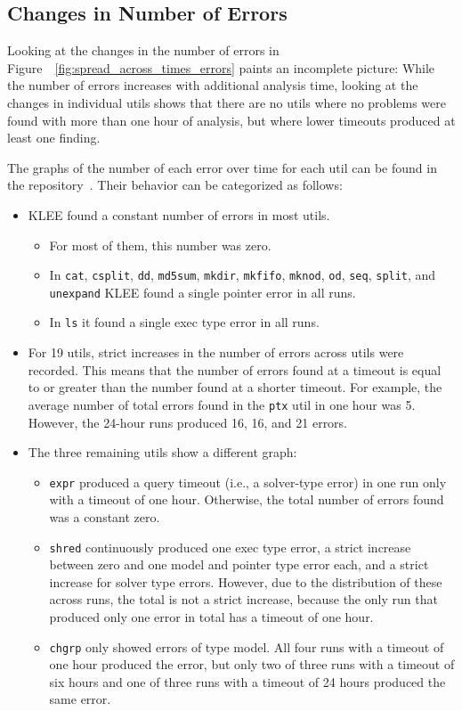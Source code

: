 \documentclass{article}
\let\savedCite=\cite
\renewcommand{\cite}{\unskip~\savedCite}
\let\savedRef=\ref
\renewcommand{\ref}{\unskip~\savedRef}
\begin{document}
\subsection{Changes in Number of Errors}

Looking at the changes in the number of errors in Figure~\ref{fig:spread_across_times_errors} paints an incomplete picture: While the number of errors increases with additional analysis time, looking at the changes in individual utils shows that there are no utils where no problems were found with more than one hour of analysis, but where lower timeouts produced at least one finding.

The graphs of the number of each error over time for each util can be found in the repository\cite{GitHub}. Their behavior can be categorized as follows:
\begin{itemize}
    \item KLEE found a constant number of errors in most utils.
          \begin{itemize}
              \item For most of them, this number was zero.
              \item In \lstinline{cat}, \lstinline{csplit}, \lstinline{dd}, \lstinline{md5sum}, \lstinline{mkdir}, \lstinline{mkfifo}, \lstinline{mknod}, \lstinline{od}, \lstinline{seq}, \lstinline{split}, and \lstinline{unexpand} KLEE found a single pointer error in all runs.
              \item In \lstinline{ls} it found a single exec type error in all runs.
          \end{itemize}
    \item For 19 utils, strict increases in the number of errors across utils were recorded. This means that the number of errors found at a timeout is equal to or greater than the number found at a shorter timeout. For example, the average number of total errors found in the \lstinline{ptx} util in one hour was 5. However, the 24-hour runs produced 16, 16, and 21 errors.
    \item The three remaining utils show a different graph:
          \begin{itemize}
              \item \lstinline{expr} produced a query timeout (i.e., a solver-type error) in one run only with a timeout of one hour. Otherwise, the total number of errors found was a constant zero.
              \item \lstinline{shred} continuously produced one exec type error, a strict increase between zero and one model and pointer type error each, and a strict increase for solver type errors. However, due to the distribution of these across runs, the total is not a strict increase, because the only run that produced only one error in total has a timeout of one hour.
              \item \lstinline{chgrp} only showed errors of type model. All four runs with a timeout of one hour produced the error, but only two of three runs with a timeout of six hours and one of three runs with a timeout of 24 hours produced the same error.
          \end{itemize}
\end{itemize}
\end{document}
